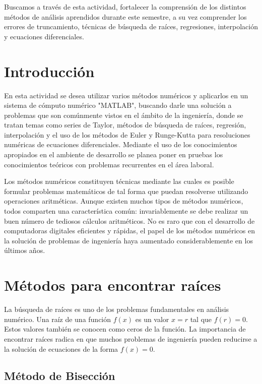 \documentclass[12pt,a4paper]{article}
\begin{document}
\noindent
Buscamos a través de esta actividad, fortalecer la comprensión de los distintos métodos de análisis aprendidos durante este semestre, a su vez comprender los errores de truncamiento, técnicas de búsqueda de raíces, regresiones, interpolación y ecuaciones diferenciales.

\section{Introducción}

En esta actividad se desea utilizar varios métodos numéricos y aplicarlos en un sistema de cómputo numérico "MATLAB", buscando darle una solución a problemas que son comúnmente vistos en el ámbito de la ingeniería, donde se tratan temas como series de Taylor, métodos de búsqueda de raíces, regresión, interpolación y el uso de los métodos de Euler y Runge-Kutta para resoluciones numéricas de ecuaciones diferenciales. Mediante el uso de los conocimientos apropiados en el ambiente de desarrollo se planea poner en pruebas los conocimientos teóricos con problemas recurrentes en el área laboral.

Los métodos numéricos constituyen técnicas mediante las cuales es posible formular problemas matemáticos de tal forma que puedan resolverse utilizando operaciones aritméticas. Aunque existen muchos tipos de métodos numéricos, todos comparten una característica común: invariablemente se debe realizar un buen número de tediosos cálculos aritméticos. No es raro que con el desarrollo de computadoras digitales eficientes y rápidas, el papel de los métodos numéricos en la solución de problemas de ingeniería haya aumentado considerablemente en los últimos años.

\section{Métodos para encontrar raíces}

La búsqueda de raíces es uno de los problemas fundamentales en análisis numérico. Una raíz de una función $f(x)$ es un valor $x = r$ tal que $f(r) = 0$. Estos valores también se conocen como ceros de la función. La importancia de encontrar raíces radica en que muchos problemas de ingeniería pueden reducirse a la solución de ecuaciones de la forma $f(x) = 0$.

\subsection{Método de Bisección}
\end{document}
